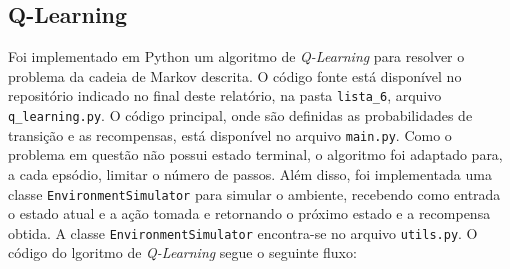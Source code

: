 \subsection*{Q-Learning}

Foi implementado em Python um algoritmo de \textit{Q-Learning} para resolver o problema da cadeia de Markov descrita. O código fonte está disponível no repositório indicado no final deste relatório, na pasta \texttt{lista\_6}, arquivo \texttt{q\_learning.py}. O código principal, onde são definidas as probabilidades de transição e as recompensas, está disponível no arquivo \texttt{main.py}. Como o problema em questão não possui estado terminal, o algoritmo foi adaptado para, a cada epsódio, limitar o número de passos. Além disso, foi implementada uma classe \texttt{EnvironmentSimulator} para simular o ambiente, recebendo como entrada o estado atual e a ação tomada e retornando o próximo estado e a recompensa obtida. A classe \texttt{EnvironmentSimulator} encontra-se no arquivo \texttt{utils.py}. O código do lgoritmo de \textit{Q-Learning} segue o seguinte fluxo:

